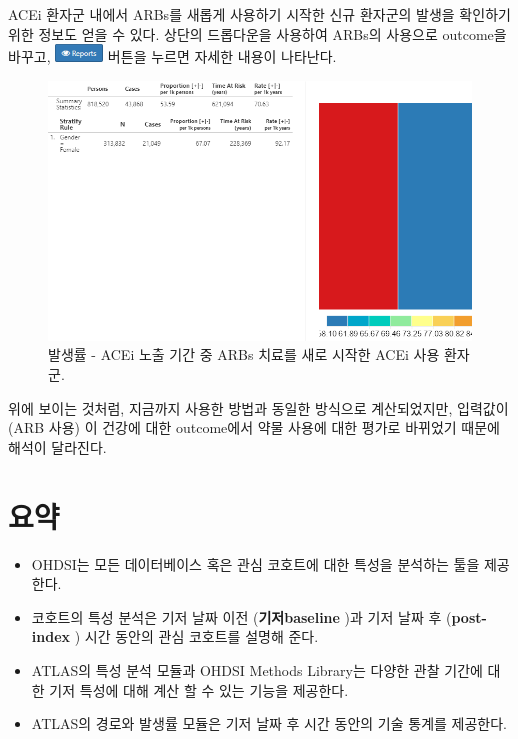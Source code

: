 \documentclass[11pt]{book}
\theoremstyle{definition}
\theoremstyle{definition}
\theoremstyle{definition}
\theoremstyle{remark}
\let\BeginKnitrBlock\begin \let\EndKnitrBlock\end
\begin{document}
ACEi 환자군 내에서 ARBs를 새롭게 사용하기 시작한 신규 환자군의 발생을
확인하기 위한 정보도 얻을 수 있다. 상단의 드롭다운을 사용하여 ARBs의
사용으로 outcome을 바꾸고,
\includegraphics{images/Characterization/atlasIncidenceReportButton.png}
버튼을 누르면 자세한 내용이 나타난다.

\begin{figure}

{\centering \includegraphics[width=1\linewidth]{images/Characterization/atlasIncidenceResultsARB} 

}

\caption{발생률 - ACEi 노출 기간 중 ARBs 치료를 새로 시작한 ACEi 사용 환자군.}\label{fig:atlasIncidenceResultsARB}
\end{figure}

위에 보이는 것처럼, 지금까지 사용한 방법과 동일한 방식으로 계산되었지만,
입력값이 (ARB 사용) 이 건강에 대한 outcome에서 약물 사용에 대한 평가로
바뀌었기 때문에 해석이 달라진다.

\section{요약}\label{-9}

\BeginKnitrBlock{rmdsummary}
\begin{itemize}
\item
  OHDSI는 모든 데이터베이스 혹은 관심 코호트에 대한 특성을 분석하는 툴을
  제공한다.
\item
  코호트의 특성 분석은 기저 날짜 이전 (\textbf{기저baseline} )과 기저
  날짜 후 (\textbf{post-index} ) 시간 동안의 관심 코호트를 설명해 준다.
\item
  ATLAS의 특성 분석 모듈과 OHDSI Methods Library는 다양한 관찰 기간에
  대한 기저 특성에 대해 계산 할 수 있는 기능을 제공한다.
\item
  ATLAS의 경로와 발생률 모듈은 기저 날짜 후 시간 동안의 기술 통계를
  제공한다.
\end{itemize}
\EndKnitrBlock{rmdsummary}
\end{document}
